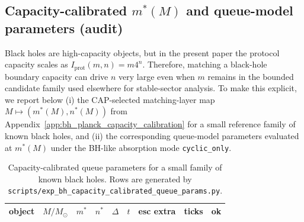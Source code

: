 %

\subsection{Capacity-calibrated \texorpdfstring{$m^\ast(M)$}{m*(M)} and queue-model parameters (audit)}
\label{subsec:bh4_capacity_calibrated_queue_params}

\AuditTag Black holes are high-capacity objects, but in the present paper the protocol capacity scales as
$I_{\mathrm{prot}}(m,n)=m4^n$. Therefore, matching a black-hole boundary capacity can drive $n$ very large
even when $m$ remains in the bounded candidate family used elsewhere for stable-sector analysis.
To make this explicit, we report below (i) the CAP-selected matching-layer map $M\mapsto(m^\ast(M),n^\ast(M))$
from Appendix~\ref{app:bh_planck_capacity_calibration} for a small reference family of known black holes,
and (ii) the corresponding queue-model parameters evaluated at $m^\ast(M)$ under the BH-like absorption mode
\texttt{cyclic\_only}.

\begin{table}[t]
\centering
\scriptsize
\setlength{\tabcolsep}{6pt}
\renewcommand{\arraystretch}{1.15}
\begin{tabular}{l r r r r r r r r}
\toprule
object & $M/M_\odot$ & $m^\ast$ & $n^\ast$ & $\Delta$ & $t$ & esc extra & ticks & ok \\
\midrule
%
\end{tabular}
\caption{Capacity-calibrated queue parameters for a small family of known black holes. Rows are generated by \texttt{scripts/exp\_bh\_capacity\_calibrated\_queue\_params.py}.}
\label{tab:bh_capacity_calibrated_queue_params}
\end{table}

%
